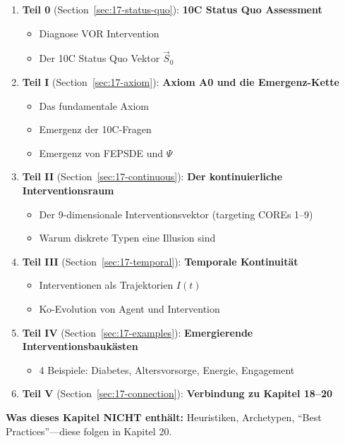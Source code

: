 \begin{tcolorbox}[colback=green!5!white, colframe=green!75!black,
    title=Kapitel\"{u}bersicht]
\begin{enumerate}
\item \textbf{Teil 0} (Section~\ref{sec:17-status-quo}): \textbf{10C Status Quo Assessment}
    \begin{itemize}[nosep]
    \item Diagnose VOR Intervention
    \item Der 10C Status Quo Vektor $\vec{S}_0$
    \end{itemize}
\item \textbf{Teil I} (Section~\ref{sec:17-axiom}): \textbf{Axiom A0 und die Emergenz-Kette}
    \begin{itemize}[nosep]
    \item Das fundamentale Axiom
    \item Emergenz der 10C-Fragen
    \item Emergenz von FEPSDE und $\Psi$
    \end{itemize}
\item \textbf{Teil II} (Section~\ref{sec:17-continuous}): \textbf{Der kontinuierliche Interventionsraum}
    \begin{itemize}[nosep]
    \item Der 9-dimensionale Interventionsvektor (targeting COREs 1--9)
    \item Warum diskrete Typen eine Illusion sind
    \end{itemize}
\item \textbf{Teil III} (Section~\ref{sec:17-temporal}): \textbf{Temporale Kontinuit\"{a}t}
    \begin{itemize}[nosep]
    \item Interventionen als Trajektorien $I(t)$
    \item Ko-Evolution von Agent und Intervention
    \end{itemize}
\item \textbf{Teil IV} (Section~\ref{sec:17-examples}): \textbf{Emergierende Interventionsbauk\"{a}sten}
    \begin{itemize}[nosep]
    \item 4 Beispiele: Diabetes, Altersvorsorge, Energie, Engagement
    \end{itemize}
\item \textbf{Teil V} (Section~\ref{sec:17-connection}): \textbf{Verbindung zu Kapitel 18--20}
\end{enumerate}

\textbf{Was dieses Kapitel NICHT enth\"{a}lt:} Heuristiken, Archetypen, ``Best Practices''---diese folgen in Kapitel 20.
\end{tcolorbox}


